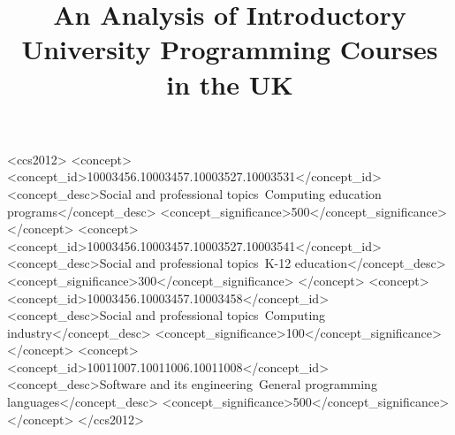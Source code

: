 \documentclass{sig-alternate}
\begin{document}
%

 \begin{CCSXML}
<ccs2012>
<concept>
<concept_id>10003456.10003457.10003527.10003531</concept_id>
<concept_desc>Social and professional topics~Computing education programs</concept_desc>
<concept_significance>500</concept_significance>
</concept>
<concept>
<concept_id>10003456.10003457.10003527.10003541</concept_id>
<concept_desc>Social and professional topics~K-12 education</concept_desc>
<concept_significance>300</concept_significance>
</concept>
<concept>
<concept_id>10003456.10003457.10003458</concept_id>
<concept_desc>Social and professional topics~Computing industry</concept_desc>
<concept_significance>100</concept_significance>
</concept>
<concept>
<concept_id>10011007.10011006.10011008</concept_id>
<concept_desc>Software and its engineering~General programming languages</concept_desc>
<concept_significance>500</concept_significance>
</concept>
</ccs2012>
\end{CCSXML}


\title{An Analysis of Introductory University Programming Courses in the UK}

\end{document}
